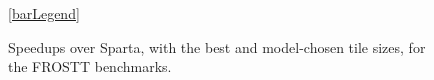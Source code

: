 \begin{figure}%
    \ref{barLegend}
    \centering
    
    
    \caption{Speedups over Sparta, with the best and model-chosen tile sizes, for the FROSTT benchmarks.}
    \label{fig::barFigures}
\end{figure}
